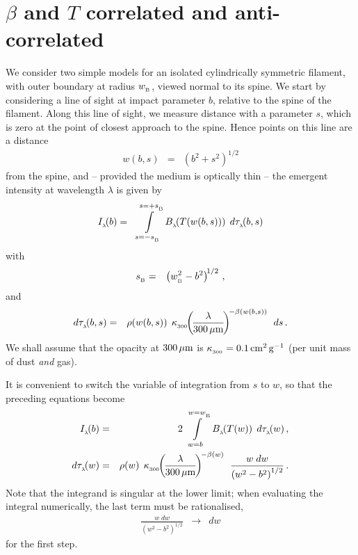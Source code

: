 \documentclass[usenatbib]{mn2e}
\newcommand{\subB}{_{_{\rm B}}}
\numberwithin{equation}{section}
\begin{document}
\section{$\beta$ and $T$ correlated and anti-correlated}

We consider two simple models for an isolated cylindrically symmetric filament, with outer boundary at radius $w\subB$, viewed normal to its spine. We start by considering a line of sight at impact parameter $b$, relative to the spine of the filament. Along this line of sight, we measure distance with a parameter $s$, which is zero at the point of closest approach to the spine. Hence points on this line are a distance
\begin{eqnarray}
w(b,s)&=&\left(b^2+s^2\right)^{1/2}
\end{eqnarray}
from the spine, and -- provided the medium is optically thin -- the emergent intensity at wavelength $\lambda$ is given by
\begin{eqnarray}
I_{_\lambda}\!(b)&=&\int\limits_{s=-s\subB}^{s=+s\subB}\,B_{_\lambda}\!(T(w(b,s)))\;\,d\tau_{_\lambda}\!(b,s)
\end{eqnarray}
with
\begin{eqnarray}
s\subB&=&\left(w\subB^2-b^2\right)^{\!1/2}\,,
\end{eqnarray}
and
\begin{eqnarray}
d\tau_{_\lambda}\!(b,s)&=&\rho(w(b,s))\;\,\kappa_{_{300}}\!\!\left(\!\frac{\lambda}{300\,\mu{\rm m}}\!\right)^{\!-\beta(w(b,s))}\;\,ds\,.
\end{eqnarray}
We shall assume that the opacity at $300\,\mu\rm{m}$ is $\kappa_{_{300}}=0.1\,\rm{cm^2\,g^{-1}}$ (per unit mass of dust {\it and} gas).

It is convenient to switch the variable of integration from $s$ to $w$, so that the preceding equations become
\begin{eqnarray}
I_{_\lambda}\!(b)&=&2\,\int\limits_{w=b}^{w=w\subB}\,B_{_\lambda}\!(T(w))\;\,d\tau_{_\lambda}\!(w)\,,\\
d\tau_{_\lambda}\!(w)&=&\rho(w)\;\,\kappa_{_{300}}\!\!\left(\!\frac{\lambda}{300\,\mu{\rm m}}\!\right)^{\!-\beta(w)}\;\,\frac{w\;dw}{\left(w^2-b^2\right)^{1/2}}\,.
\end{eqnarray}
Note that the integrand is singular at the lower limit; when evaluating the integral numerically, the last term must be rationalised,
\begin{eqnarray}
\frac{w\;dw}{\left(w^2-b^2\right)^{1/2}}&\longrightarrow&dw
\end{eqnarray}
for the first step.
\end{document}
